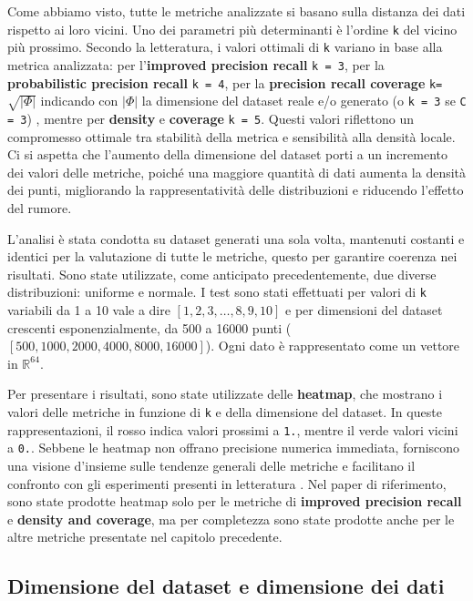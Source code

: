 Come abbiamo visto, tutte le metriche analizzate si basano sulla distanza dei dati rispetto ai loro vicini. Uno dei parametri più determinanti è l'ordine \texttt{k} del vicino più prossimo. Secondo la letteratura, i valori ottimali di \texttt{k} variano in base alla metrica analizzata: per l’\textbf{improved precision recall} \texttt{k = 3}, per la \textbf{probabilistic precision recall} \texttt{k = 4}, per la \textbf{precision recall coverage} \texttt{k=\(\sqrt{|\Phi|}\)} indicando con \(|\Phi|\) la dimensione del dataset reale e/o generato (o \texttt{k = 3} se \texttt{C = 3})
, mentre per \textbf{density} e \textbf{coverage} \texttt{k = 5}. Questi valori riflettono un compromesso ottimale tra stabilità della metrica e sensibilità alla densità locale. Ci si aspetta che l'aumento della dimensione del dataset porti a un incremento dei valori delle metriche, poiché una maggiore quantità di dati aumenta la densità dei punti, migliorando la rappresentatività delle distribuzioni e riducendo l’effetto del rumore.

L'analisi è stata condotta su dataset generati una sola volta, mantenuti costanti e identici per la valutazione di tutte le metriche, questo per garantire coerenza nei risultati. Sono state utilizzate, come anticipato precedentemente, due diverse distribuzioni: uniforme e normale. I test sono stati effettuati per valori di \texttt{k} variabili da 1 a 10 vale a dire \([1,2,3,\dots,8,9,10]\) e per dimensioni del dataset crescenti esponenzialmente, da 500 a 16000 punti (\([500,1000,2000,4000,8000,16000]\)). Ogni dato è rappresentato come un vettore in \(\mathbb{R}^{64}\).

Per presentare i risultati, sono state utilizzate delle \textbf{heatmap}, che mostrano i valori delle metriche in funzione di \texttt{k} e della dimensione del dataset. In queste rappresentazioni, il rosso indica valori prossimi a \texttt{1.}, mentre il verde valori vicini a \texttt{0.}. Sebbene le heatmap non offrano precisione numerica immediata, forniscono una visione d’insieme sulle tendenze generali delle metriche e facilitano il confronto con gli esperimenti presenti in letteratura \cite{3ReliableFidelityDiversityMetrics}. Nel paper di riferimento, sono state prodotte heatmap solo per le metriche di \textbf{improved precision recall} e \textbf{density and coverage}, ma per completezza sono state prodotte anche per le altre metriche presentate nel capitolo precedente.

\subsection{Dimensione del dataset e dimensione dei dati}

